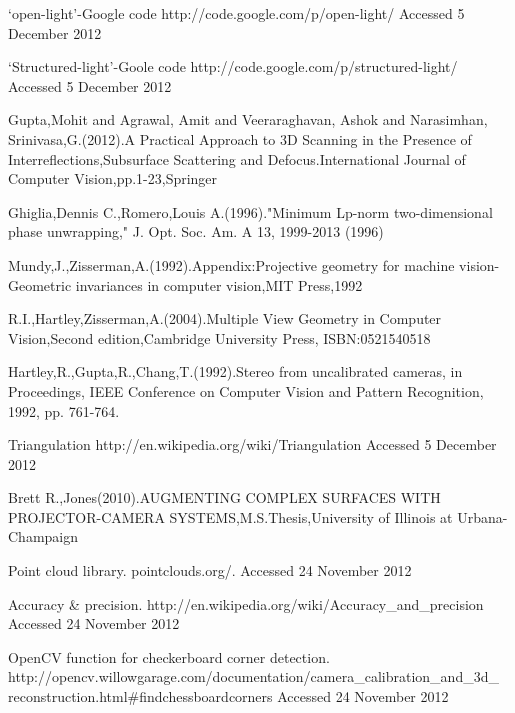 \begin{singlespace}
\begin{thebibliography}{10000000000}
`open-light'-Google code \newline
http://code.google.com/p/open-light/\newline
Accessed 5 December 2012 

`Structured-light'-Goole code \newline
http://code.google.com/p/structured-light/ \newline
Accessed 5 December 2012

Gupta,Mohit and Agrawal, Amit and Veeraraghavan, Ashok and Narasimhan, Srinivasa,G.(2012).A Practical Approach to 3D Scanning in the Presence of Interreflections,Subsurface Scattering and Defocus.International Journal of Computer Vision,pp.1-23,Springer

Ghiglia,Dennis C.,Romero,Louis A.(1996)."Minimum Lp-norm two-dimensional phase unwrapping," J. Opt. Soc. Am. A 13, 1999-2013 (1996)

Mundy,J.,Zisserman,A.(1992).Appendix:Projective geometry for machine vision-Geometric invariances in computer vision,MIT Press,1992 
 

R.I.,Hartley,Zisserman,A.(2004).Multiple View Geometry in Computer Vision,Second edition,Cambridge University Press, ISBN:0521540518
  
Hartley,R.,Gupta,R.,Chang,T.(1992).Stereo from uncalibrated cameras, 
in Proceedings, IEEE Conference on Computer Vision and Pattern Recognition, 1992, pp. 761-764. 

Triangulation\newline 
http://en.wikipedia.org/wiki/Triangulation\newline
Accessed 5 December 2012

Brett R.,Jones(2010).AUGMENTING COMPLEX SURFACES WITH PROJECTOR-CAMERA SYSTEMS,M.S.Thesis,University of Illinois at Urbana-Champaign

Point cloud library.\newline
pointclouds.org/.\newline
Accessed 24 November 2012

Accuracy \& precision.\newline
http://en.wikipedia.org/wiki/Accuracy\_and\_precision\newline
Accessed 24 November 2012

OpenCV function for checkerboard corner detection.\newline
http://opencv.willowgarage.com/documentation/camera\_calibration\_and\_3d\_\newline
reconstruction.html\#findchessboardcorners\newline
Accessed 24 November 2012


\end{thebibliography}
\end{singlespace}
